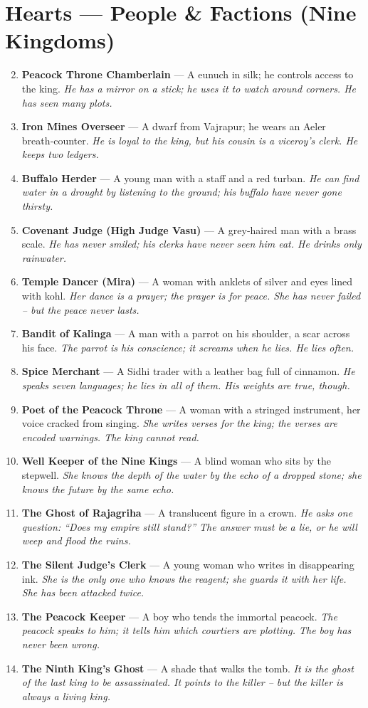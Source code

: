 \documentclass[11pt]{book}
\begin{document}
\section*{Hearts — People \& Factions (Nine Kingdoms)}
\begin{enumerate}
\setcounter{enumi}{1}
\item \textbf{Peacock Throne Chamberlain} — A eunuch in silk; he controls access to the king. \textit{He has a mirror on a stick; he uses it to watch around corners. He has seen many plots.}
\item \textbf{Iron Mines Overseer} — A dwarf from Vajrapur; he wears an Aeler breath‑counter. \textit{He is loyal to the king, but his cousin is a viceroy’s clerk. He keeps two ledgers.}
\item \textbf{Buffalo Herder} — A young man with a staff and a red turban. \textit{He can find water in a drought by listening to the ground; his buffalo have never gone thirsty.}
\item \textbf{Covenant Judge (High Judge Vasu)} — A grey‑haired man with a brass scale. \textit{He has never smiled; his clerks have never seen him eat. He drinks only rainwater.}
\item \textbf{Temple Dancer (Mira)} — A woman with anklets of silver and eyes lined with kohl. \textit{Her dance is a prayer; the prayer is for peace. She has never failed – but the peace never lasts.}
\item \textbf{Bandit of Kalinga} — A man with a parrot on his shoulder, a scar across his face. \textit{The parrot is his conscience; it screams when he lies. He lies often.}
\item \textbf{Spice Merchant} — A Sidhi trader with a leather bag full of cinnamon. \textit{He speaks seven languages; he lies in all of them. His weights are true, though.}
\item \textbf{Poet of the Peacock Throne} — A woman with a stringed instrument, her voice cracked from singing. \textit{She writes verses for the king; the verses are encoded warnings. The king cannot read.}
\item \textbf{Well Keeper of the Nine Kings} — A blind woman who sits by the stepwell. \textit{She knows the depth of the water by the echo of a dropped stone; she knows the future by the same echo.}
\item[J] \textbf{The Ghost of Rajagriha} — A translucent figure in a crown. \textit{He asks one question: “Does my empire still stand?” The answer must be a lie, or he will weep and flood the ruins.}
\item[Q] \textbf{The Silent Judge’s Clerk} — A young woman who writes in disappearing ink. \textit{She is the only one who knows the reagent; she guards it with her life. She has been attacked twice.}
\item[K] \textbf{The Peacock Keeper} — A boy who tends the immortal peacock. \textit{The peacock speaks to him; it tells him which courtiers are plotting. The boy has never been wrong.}
\item[A] \textbf{The Ninth King’s Ghost} — A shade that walks the tomb. \textit{It is the ghost of the last king to be assassinated. It points to the killer – but the killer is always a living king.}
\end{enumerate}
\end{document}
